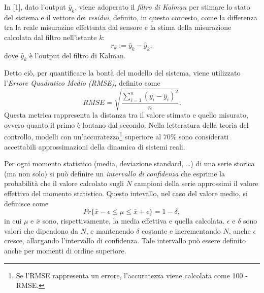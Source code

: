 \documentclass[Lau,binding=0.6cm]{sapthesis}
\begin{document}
In [1], dato l'output $\bar{y}_k$, viene adoperato il \textit{filtro di Kalman} per stimare lo stato del sistema e il vettore dei \textit{residui}, definito, in questo contesto, come la differenza tra la reale misurazine effettuata dal sensore
e la stima della misurazione calcolata dal filtro nell'istante $k$:
\begin{equation}
    r_k := \bar{y}_k - \hat{y}_k,
\end{equation}
dove $\hat{y}_k$ \`e l'output del filtro di Kalman.

Detto ci\`o, per quantificare la bont\`a del modello del sistema, viene utilizzato l'\textit{Errore Quadratico Medio (RMSE)}, definito come
\begin{equation}
    RMSE = \sqrt{\frac{\sum_{i=1}^n (y_i - \hat{y}_i)^2}{n}}\label{eq:5}.
\end{equation}
Questa metrica rappresenta la distanza tra il valore stimato e quello misurato, ovvero quanto il primo \`e lontano dal secondo.
Nella letteratura della teoria del controllo, modelli con un'accuratezza\footnote{Se l'RMSE rappresenta un errore, l'accuratezza viene calcolata come 100 - RMSE.} superiore al 70\% sono considerati accettabili approssimazioni della dinamica di sistemi reali.

Per ogni momento statistico (media, deviazione standard, \ldots) di una serie storica (ma non solo) si pu\`o definire un \textit{intervallo di confidenza} 
che esprime la probabilit\`a che il valore calcolato sugli $N$ campioni della serie approssimi il valore effettivo del momento statistico.
Questo intevallo, nel caso del valore medio, si definisce come 
\begin{equation}
    Pr\{\bar{x} - \epsilon \leq \mu \leq \bar{x} + \epsilon\} = 1 - \delta,
    \label{eq:2}
\end{equation}
in cui $\mu$ e $\bar{x}$ sono, rispettivamente, la media effettiva e quella calcolata. $\epsilon$ e $\delta$ sono valori che dipendono da $N$, e mantenendo $\delta$ costante
e incrementando $N$, anche $\epsilon$ cresce, allargando l'intervallo di confidenza.
Tale intervallo pu\`o essere definito anche per momenti di ordine superiore.
\end{document}
